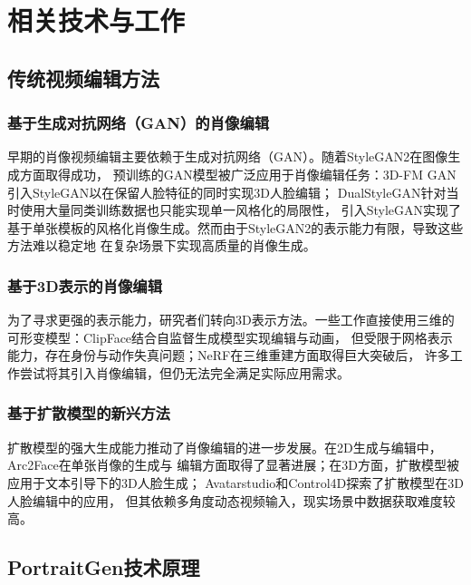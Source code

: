 \chapter{相关技术与工作}

\section{传统视频编辑方法}

\subsection{基于生成对抗网络（GAN）的肖像编辑}
早期的肖像视频编辑主要依赖于生成对抗网络（GAN）。随着StyleGAN2\cite{karras2020analyzing}在图像生成方面取得成功，
预训练的GAN模型被广泛应用于肖像编辑任务：3D-FM GAN\cite{liu20223d}引入StyleGAN以在保留人脸特征的同时实现3D人脸编辑；
DualStyleGAN\cite{yang2022pastiche}针对当时使用大量同类训练数据也只能实现单一风格化的局限性，
引入StyleGAN实现了基于单张模板的风格化肖像生成。然而由于StyleGAN2的表示能力有限，导致这些方法难以稳定地
在复杂场景下实现高质量的肖像生成。

\subsection{基于3D表示的肖像编辑}
为了寻求更强的表示能力，研究者们转向3D表示方法。一些工作直接使用三维的可形变模型：ClipFace\cite{aneja2023clipface}结合自监督生成模型实现编辑与动画，
但受限于网格表示能力，存在身份与动作失真问题；NeRF\cite{mildenhall2021nerf}在三维重建方面取得巨大突破后，
许多工作\cite{abdal20233davatargan}\cite{bao2024geneavatar}\cite{sun2023next3d}尝试将其引入肖像编辑，但仍无法完全满足实际应用需求。

\subsection{基于扩散模型的新兴方法}
扩散模型\cite{rombach2022high}的强大生成能力推动了肖像编辑的进一步发展。在2D生成与编辑中，Arc2Face\cite{papantoniou2024arc2face}在单张肖像的生成与
编辑方面取得了显著进展；在3D方面，扩散模型被应用于文本引导下的3D人脸生成\cite{han2023headsculpt}\cite{zhang2023dreamface}；
Avatarstudio\cite{mendiratta2023avatarstudio}和Control4D\cite{shao2024control4d}探索了扩散模型在3D人脸编辑中的应用，
但其依赖多角度动态视频输入，现实场景中数据获取难度较高。

\section{PortraitGen技术原理}

